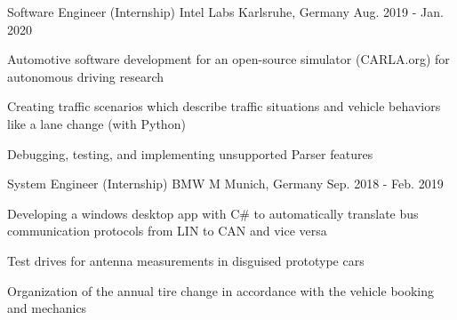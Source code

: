 \begin{cventries}
  \cventry
    {Software Engineer (Internship)} %
    {Intel Labs} %
    {Karlsruhe, Germany} %
    {Aug. 2019 - Jan. 2020} %
    {
      \begin{cvitems} %
      \item {Automotive software development for an open-source simulator (CARLA.org) for autonomous driving research}
        \item {Creating traffic scenarios which describe traffic situations and vehicle behaviors like a lane change (with Python)}
        \item{Debugging, testing, and implementing unsupported Parser features}
      \end{cvitems}
    }

  \cventry
    {System Engineer (Internship)} %
    {BMW M} %
    {Munich, Germany} %
    {Sep. 2018 - Feb. 2019} %
    {
      \begin{cvitems} %
        \item {Developing a windows desktop app with C\# to automatically translate bus communication protocols from LIN to CAN and vice versa}
        \item {Test drives for antenna measurements in disguised prototype cars}
        \item {Organization of the annual tire change in accordance with the vehicle booking and mechanics}
      \end{cvitems}
    }
\end{cventries}
